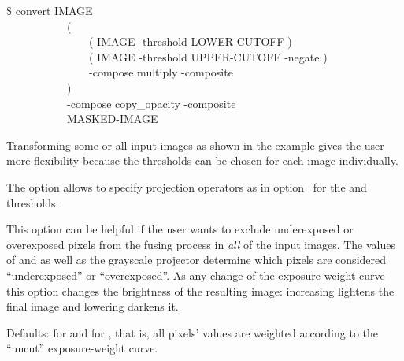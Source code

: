\begin{codelist}
\begin{geeknote}
\begin{exemplar}
      \smallskip

      \begin{terminal}
        \$ convert IMAGE \bslash \\
        ~~~~~~~~~~~\bslash( \bslash \\
        ~~~~~~~~~~~~~~~\bslash( IMAGE -threshold LOWER-CUTOFF \bslash) \bslash \\
        ~~~~~~~~~~~~~~~\bslash( IMAGE -threshold UPPER-CUTOFF -negate \bslash) \bslash \\
        ~~~~~~~~~~~~~~~-compose multiply -composite \bslash \\
        ~~~~~~~~~~~\bslash) \bslash \\
        ~~~~~~~~~~~-compose copy\_opacity -composite \bslash \\
        ~~~~~~~~~~~MASKED-IMAGE
      \end{terminal}

      \caption[ for exposure cutoff]%
              {\label{ex:imagemagick-convert-cutoff}%
                Using  for exposure cutoff operations.  The first
                example only applies a lower cutoff, whereas the second one applies both a
                lower and an upper cutoff to the images.}
    \end{exemplar}

    Transforming some or all input images as shown in the example gives the user more
    flexibility because the thresholds can be chosen for each image individually.
  \end{geeknote}

  The option allows to specify projection operators as in
  option~ for the
  \metalowercutoff{} and \metauppercutoff{} thresholds.

  This option can be helpful if the user wants to exclude underexposed or overexposed pixels
  from the fusing process in \emph{all} of the input images.  The values of \metalowercutoff{}
  and \metauppercutoff{} as well as the grayscale projector determine which pixels are
  considered ``underexposed'' or ``overexposed''.  As any change of the exposure-weight curve
  this option changes the brightness of the resulting image: increasing \metalowercutoff{}
  lightens the final image and lowering \metauppercutoff{} darkens it.

  Defaults:  for \metalowercutoff{} and
   for \metauppercutoff, that is, all pixels' values are
  weighted according to the ``uncut'' exposure-weight curve.


\end{codelist}
